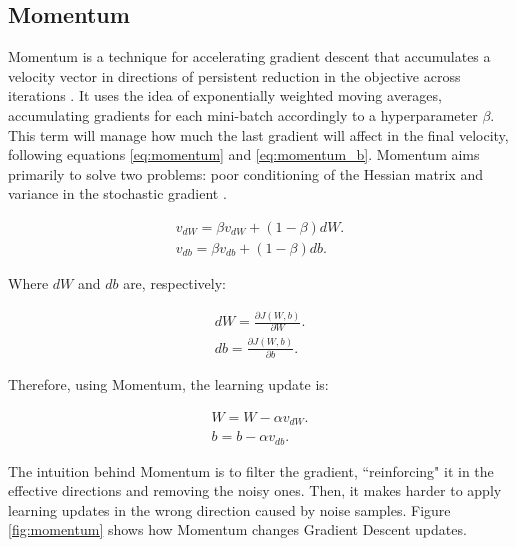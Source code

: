 \subsection{Momentum}

Momentum is a technique for accelerating gradient descent that accumulates a velocity vector in directions of persistent reduction in the objective across iterations \cite{Sutskever:2013:IIM:3042817.3043064}. It uses the idea of exponentially weighted moving averages, accumulating gradients for each mini-batch accordingly to a hyperparameter $\beta$. This term will manage how much the last gradient will affect in the final velocity, following equations \ref{eq:momentum} and \ref{eq:momentum_b}. Momentum aims primarily to solve two problems: poor conditioning of the
Hessian matrix and variance in the stochastic gradient \cite{Goodfellow-et-al-2016}.


\begin{align}\label{eq:momentum}
v_{dW} = \beta v_{dW} + (1 - \beta)dW.\\
v_{db} = \beta v_{db} + (1 - \beta)db.
\label{eq:momentum_b}
\end{align}

Where $dW$ and $db$ are, respectively:

\begin{align}
dW = \frac{\partial{J(W,b)}}{\partial{W}}.\\
db = \frac{\partial{J(W,b)}}{\partial{b}}.
\end{align}

Therefore, using Momentum, the learning update is:

\begin{align}\label{eq:momentumupdate}
W = W - \alpha v_{dW}.\\
b = b - \alpha v_{db}.
\end{align}

The intuition behind Momentum is to filter the gradient, ``reinforcing" it in the effective directions and removing the noisy ones. Then, it makes harder to apply learning updates in the wrong direction caused by noise samples. Figure \ref{fig:momentum} shows how Momentum changes Gradient Descent updates.


